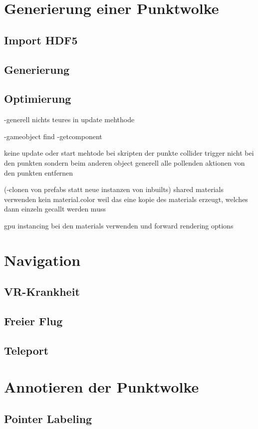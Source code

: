 
\section{Generierung einer Punktwolke}
\subsection{Import HDF5}
\subsection{Generierung}
\subsection{Optimierung}
-generell nichts teures in update mehthode
	
-gameobject find
-getcomponent

keine update oder start mehtode bei skripten der punkte
collider trigger nicht bei den punkten sondern beim anderen object
generell alle pollenden aktionen von den punkten entfernen


(-clonen von prefabs statt neue instanzen von inbuilts)
shared materials verwenden   kein material.color weil das eine kopie des materials erzeugt, welches dann einzeln gecallt werden muss

gpu instancing bei den materials verwenden und forward rendering options

\section{Navigation}
\subsection{VR-Krankheit}
\subsection{Freier Flug}
\subsection{Teleport}

\section{Annotieren der Punktwolke}
\subsection{Pointer Labeling}
